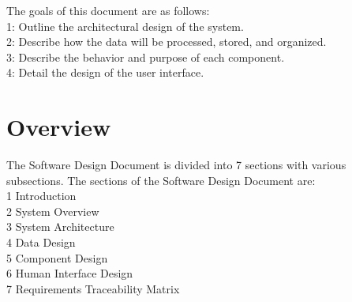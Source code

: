 \documentclass[letterpaper,12pt,oneside,listof=totoc,parskip=full]{scrreprt}
\begin{document}
The goals of this document are as follows:\\
\hspace*{1cm} 1: Outline the architectural design of the system.\\
\hspace*{1cm} 2: Describe how the data will be processed, stored, and organized. \\
\hspace*{1cm} 3: Describe the behavior and purpose of each component. \\
\hspace*{1cm} 4: Detail the design of the user interface.\\

\section{Overview}

The Software Design Document is divided into 7 sections with various subsections. The
sections of the Software Design Document are:\\
\hspace*{1cm} 1 \;\;Introduction\\
\hspace*{1cm} 2 \;\;System Overview\\
\hspace*{1cm} 3 \;\;System Architecture \\
\hspace*{1cm} 4 \;\;Data Design\\
\hspace*{1cm} 5 \;\;Component Design\\
\hspace*{1cm} 6 \;\;Human Interface Design\\
\hspace*{1cm} 7 \;\;Requirements Traceability Matrix\\

\renewcommand{\bibname}{\section{References}}


\end{document}
